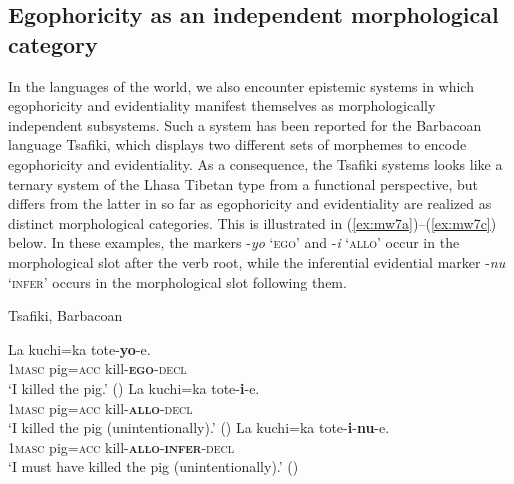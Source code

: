 \documentclass[output=paper]{langsci/langscibook}
\begin{document}
\subsection{Egophoricity as an independent morphological category}\label{s:mw4-2}

In the languages of the world, we also encounter epistemic systems in which egophoricity and evidentiality manifest themselves as morphologically independent subsystems. Such a system has been reported for the Barbacoan language Tsafiki, which displays two different sets of morphemes to encode egophoricity and evidentiality. As a consequence, the Tsafiki systems looks like a ternary system of the Lhasa Tibetan type from a functional perspective, but differs from the latter in so far as egophoricity and evidentiality are realized as distinct morphological categories. This is illustrated in (\ref{ex:mw7a})--(\ref{ex:mw7c}) below. In these examples, the markers -\textit{yo} ‘\textsc{ego}’ and -\textit{i} ‘\textsc{allo}’ occur in the morphological slot after the verb root, while the inferential evidential marker -\textit{nu} ‘\textsc{infer}’ occurs in the morphological slot following them.

\begin{exe}
	\ex Tsafiki, Barbacoan\label{ex:mw7}
	\begin{xlist}
	\ex \label{ex:mw7a}
	\gll La kuchi=ka tote-\textbf{yo}-e.\\
	1\textsc{masc} pig=\textsc{acc} kill-\textbf{\textsc{ego}}-\textsc{decl}\\
	\trans ‘I killed the pig.’ (\citealt[412]{Dickinson2000})
	\ex \label{ex:mw7b}
	\gll La kuchi=ka tote-\textbf{i}-e.\\
	1\textsc{masc} pig=\textsc{acc} kill-\textbf{\textsc{allo}}-\textsc{decl}\\
	\trans ‘I killed the pig (unintentionally).’ (\citealt[412]{Dickinson2000})
	\ex	\label{ex:mw7c}
	\gll La kuchi=ka tote-\textbf{i}-\textbf{nu}-e.\\
	1\textsc{masc} pig=\textsc{acc} kill-\textbf{\textsc{allo}}-\textbf{\textsc{infer}}-\textsc{decl}\\
	\trans ‘I must have killed the pig (unintentionally).’ (\citealt[412]{Dickinson2000})
	\end{xlist}
\end{exe}
\end{document}
